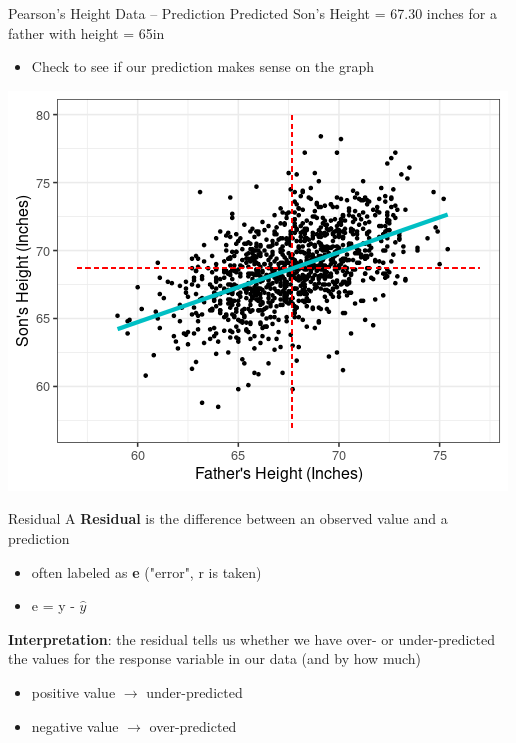 \documentclass{beamer}
\begin{document}
\begin{frame}{Pearson's Height Data -- Prediction}
Predicted Son's Height = 67.30 inches for a father with height = 65in
\begin{itemize}
    \item Check to see if our prediction makes sense on the graph
\end{itemize}
\begin{center}
\includegraphics[scale=.5]{img/father_son_lm.png}
\end{center}
\end{frame}


\begin{frame}{Residual}
A \textbf{Residual} is the difference between an observed value and a prediction

\begin{itemize}
    \item often labeled as \textbf{e} \hspace{2mm}("error", r is taken)
    \item e = y - $\hat{y}$
\end{itemize} \vspace{6mm}

\textbf{Interpretation}: the residual tells us whether we have over- or under-predicted the values for the response variable in our data (and by how much)
\begin{itemize}
    \item positive value $\rightarrow$ under-predicted
    \item negative value $\rightarrow$ over-predicted
\end{itemize}
    
\end{frame}
\end{document}
